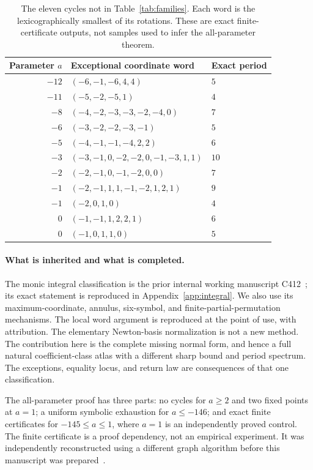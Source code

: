 \begin{table}[htbp]
\centering
\small
\begin{tabular}{@{}rll@{}}
\toprule
Parameter $a$ & Exceptional coordinate word & Exact period \\
\midrule
$-12$ & $(-6,-1,-6,4,4)$ & $5$ \\
$-11$ & $(-5,-2,-5,1)$ & $4$ \\
$-8$ & $(-4,-2,-3,-3,-2,-4,0)$ & $7$ \\
$-6$ & $(-3,-2,-2,-3,-1)$ & $5$ \\
$-5$ & $(-4,-1,-1,-4,2,2)$ & $6$ \\
$-3$ & $(-3,-1,0,-2,-2,0,-1,-3,1,1)$ & $10$ \\
$-2$ & $(-2,-1,0,-1,-2,0,0)$ & $7$ \\
$-1$ & $(-2,-1,1,1,-1,-2,1,2,1)$ & $9$ \\
$-1$ & $(-2,0,1,0)$ & $4$ \\
$0$ & $(-1,-1,1,2,2,1)$ & $6$ \\
$0$ & $(-1,0,1,1,0)$ & $5$ \\
\bottomrule
\end{tabular}
\caption{The eleven cycles not in Table~\ref{tab:families}.
Each word is the lexicographically smallest of its rotations.
These are exact finite-certificate outputs, not samples used to infer
the all-parameter theorem.}
\label{tab:exceptions}
\end{table}

\paragraph{What is inherited and what is completed.}
The monic integral classification is the prior internal working
manuscript C412~\cite{c412}; its exact statement is reproduced in
Appendix~\ref{app:integral}. We also use its maximum-coordinate,
annulus, six-symbol, and finite-partial-permutation mechanisms.
The local word argument is reproduced at the point of use, with
attribution. The elementary Newton-basis normalization is not a new
method. The contribution here is the complete missing normal form,
and hence a full natural coefficient-class atlas with a different
sharp bound and period spectrum. The exceptions, equality locus,
and return law are consequences of that one classification.

The all-parameter proof has three parts: no cycles for $a\ge2$ and
two fixed points at $a=1$; a uniform symbolic exhaustion for
$a\le-146$; and exact finite certificates for $-145\le a\le1$,
where $a=1$ is an independently proved control. The finite certificate
is a proof dependency, not an empirical experiment. It was independently
reconstructed using a different graph algorithm before this manuscript
was prepared~\cite{am1certificate}.

